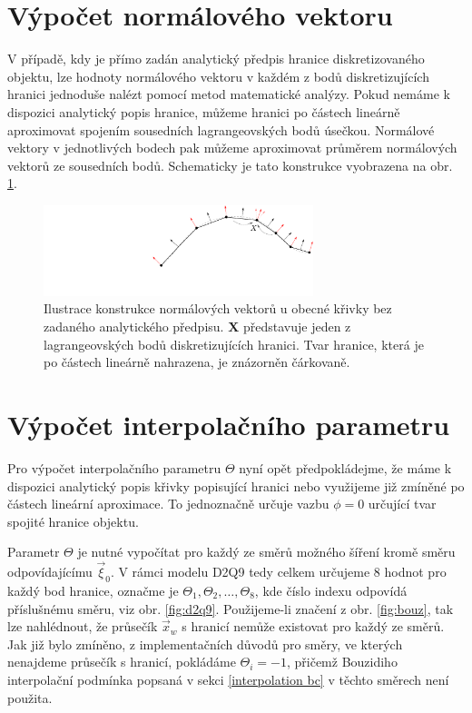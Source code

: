 \section{Výpočet normálového vektoru}
V případě, kdy je přímo zadán analytický předpis hranice diskretizovaného objektu, lze hodnoty normálového vektoru v každém z bodů diskretizujících hranici jednoduše nalézt pomocí metod matematické analýzy. Pokud nemáme k dispozici analytický popis hranice, můžeme hranici po částech lineárně aproximovat spojením sousedních lagrangeovských bodů úsečkou. Normálové vektory v jednotlivých bodech pak můžeme aproximovat průměrem normálových vektorů ze sousedních bodů. Schematicky je tato konstrukce vyobrazena na obr. \ref{fig:aproximace hranice}.


\begin{figure}[H]
	\centering
	\vspace{2.8mm}
	\includegraphics[width=0.7\textwidth, trim={7.9cm 1.6cm 0cm 0cm}]{Images/lincurve.pdf}
	\vspace{1.8mm}
	\caption{Ilustrace konstrukce normálových vektorů u obecné křivky bez zadaného analytického předpisu. $ \boldsymbol{X} $ představuje jeden z lagrangeovských bodů diskretizujících hranici. Tvar hranice, která je po částech lineárně nahrazena, je znázorněn čárkovaně.}
	\label{fig:aproximace hranice}
	\vspace{0mm}
\end{figure}


\section{Výpočet interpolačního parametru}
Pro výpočet interpolačního parametru $ \Theta $ nyní opět předpokládejme, že máme k dispozici analytický popis křivky popisující hranici nebo využijeme již zmíněné po částech lineární aproximace. To jednoznačně určuje vazbu $ \phi = 0$ určující tvar spojité hranice objektu.

Parametr $ \Theta $ je nutné vypočítat pro každý ze směrů možného šíření kromě směru odpovídajícímu $ \vec{\xi}_0 $. V rámci modelu D2Q9 tedy celkem určujeme 8 hodnot pro každý bod hranice, označme je $ \Theta_1, \Theta_2, \dots, \Theta_8$, kde číslo indexu odpovídá příslušnému směru, viz obr. \ref{fig:d2q9}. Použijeme-li značení z obr. \ref{fig:bouz}, tak lze nahlédnout, že průsečík $ \vec{x}_w $ s hranicí nemůže existovat pro každý ze směrů. Jak již bylo zmíněno, z implementačních důvodů pro směry, ve kterých nenajdeme průsečík s hranicí, pokládáme  $ \Theta_i = -1$, přičemž Bouzidiho interpolační podmínka popsaná v sekci \ref{interpolation bc} v těchto směrech není použita.

